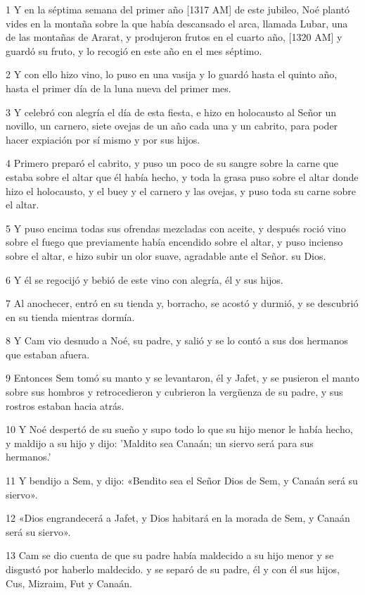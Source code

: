 \par 1 Y en la séptima semana del primer año [1317 AM] de este jubileo, Noé plantó vides en la montaña sobre la que había descansado el arca, llamada Lubar, una de las montañas de Ararat, y produjeron frutos en el cuarto año, [1320 AM] y guardó su fruto, y lo recogió en este año en el mes séptimo.
\par 2 Y con ello hizo vino, lo puso en una vasija y lo guardó hasta el quinto año, hasta el primer día de la luna nueva del primer mes.
\par 3 Y celebró con alegría el día de esta fiesta, e hizo en holocausto al Señor un novillo, un carnero, siete ovejas de un año cada una y un cabrito, para poder hacer expiación por sí mismo y por sus hijos.
\par 4 Primero preparó el cabrito, y puso un poco de su sangre sobre la carne que estaba sobre el altar que él había hecho, y toda la grasa puso sobre el altar donde hizo el holocausto, y el buey y el carnero y las ovejas, y puso toda su carne sobre el altar.
\par 5 Y puso encima todas sus ofrendas mezcladas con aceite, y después roció vino sobre el fuego que previamente había encendido sobre el altar, y puso incienso sobre el altar, e hizo subir un olor suave, agradable ante el Señor. su Dios.
\par 6 Y él se regocijó y bebió de este vino con alegría, él y sus hijos.
\par 7 Al anochecer, entró en su tienda y, borracho, se acostó y durmió, y se descubrió en su tienda mientras dormía.
\par 8 Y Cam vio desnudo a Noé, su padre, y salió y se lo contó a sus dos hermanos que estaban afuera.
\par 9 Entonces Sem tomó su manto y se levantaron, él y Jafet, y se pusieron el manto sobre sus hombros y retrocedieron y cubrieron la vergüenza de su padre, y sus rostros estaban hacia atrás.
\par 10 Y Noé despertó de su sueño y supo todo lo que su hijo menor le había hecho, y maldijo a su hijo y dijo: 'Maldito sea Canaán; un siervo será para sus hermanos.'
\par 11 Y bendijo a Sem, y dijo: «Bendito sea el Señor Dios de Sem, y Canaán será su siervo».
\par 12 «Dios engrandecerá a Jafet, y Dios habitará en la morada de Sem, y Canaán será su siervo».
\par 13 Cam se dio cuenta de que su padre había maldecido a su hijo menor y se disgustó por haberlo maldecido. y se separó de su padre, él y con él sus hijos, Cus, Mizraim, Fut y Canaán.
